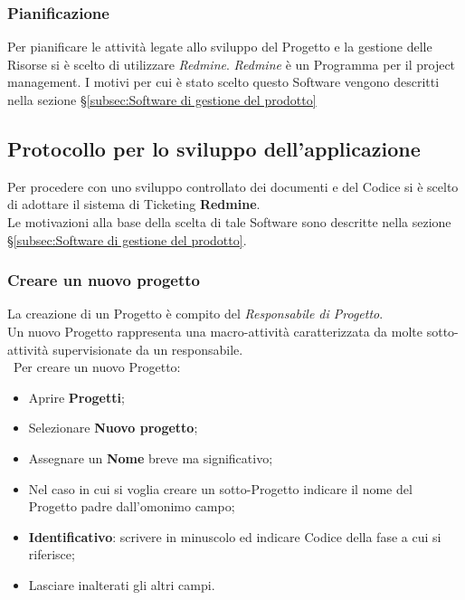 \subsubsection{Pianificazione}
\label{sec:Pianificazione}
Per pianificare le attività legate allo sviluppo del Progetto e la gestione delle Risorse si è scelto di utilizzare \emph{Redmine}.
\emph{Redmine} è un Programma per il project management. I motivi per cui è stato scelto questo Software vengono descritti nella sezione \S\ref{subsec:Software di gestione del prodotto}


\subsection{Protocollo per lo sviluppo dell'applicazione}
\label{sec:protocolloSviluppo} 
Per procedere con uno sviluppo controllato dei documenti e del Codice si è scelto di adottare il sistema di Ticketing \textbf{Redmine}.\\ 
Le motivazioni alla base della scelta di tale Software sono descritte nella sezione \S\ref{subsec:Software di gestione del prodotto}.

\subsubsection{Creare un nuovo progetto} 

La creazione di un Progetto è compito del \emph{Responsabile di Progetto}.\\ 
Un nuovo Progetto rappresenta una macro-attività caratterizzata da molte sotto-attività supervisionate da un responsabile.\\\
Per creare un nuovo Progetto:
\begin{itemize}
\item Aprire \textbf{Progetti}; 
\item Selezionare \textbf{Nuovo progetto}; 
\item Assegnare un \textbf{Nome} breve ma significativo; 
\item Nel caso in cui si voglia creare un sotto-Progetto indicare il nome del Progetto padre dall’omonimo campo; 
\item \textbf{Identificativo}: scrivere in minuscolo ed indicare Codice\ped{g} della fase a cui si riferisce;
\item Lasciare inalterati gli altri campi. 
\end{itemize}
 
